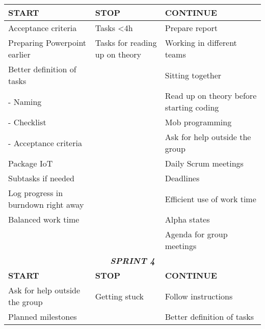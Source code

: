 \begin{table}[htbp]
{\begin{tabular}{lll}
\textbf{START}                      & \textbf{STOP}                      & \textbf{CONTINUE}                                \\ \hline
Acceptance criteria                 & Tasks \textless 4h                 & Prepare report                                   \\
Preparing Powerpoint earlier        & Tasks for reading up on theory     & Working in different teams                       \\
Better definition of tasks          &                                    & Sitting together                                 \\
- Naming                            &                                    & Read up on theory before starting coding         \\
- Checklist                         &                                    & Mob programming                                  \\
- Acceptance criteria               &                                    & Ask for help outside the group                   \\
Package IoT                         &                                    & Daily Scrum meetings                             \\
Subtasks if needed                  &                                    & Deadlines                                        \\
Log progress in burndown right away &                                    & Efficient use of work time                       \\
Balanced work time                  &                                    & Alpha states                                     \\
                                    &                                    & Agenda for group meetings                        \\ \hline
\multicolumn{3}{c}{\cellcolor{grey}\textit{\textbf{SPRINT 4}}}                                                                              \\ \hline
\textbf{START}                      & \textbf{STOP}                      & \textbf{CONTINUE}                                \\ \hline
Ask for help outside the group      & Getting stuck                      & Follow instructions                              \\
Planned milestones                  &                                    & Better definition of tasks                       \\

\end{tabular}}
\end{table}
